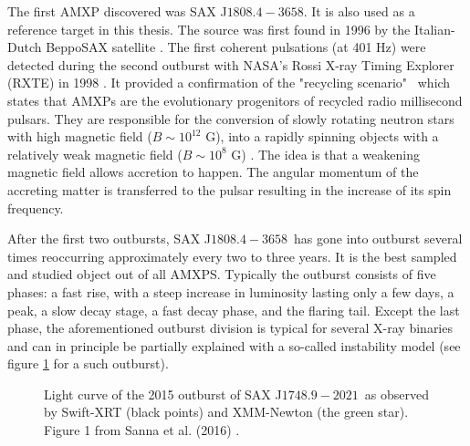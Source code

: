 \documentclass{wihuri}
\def\source{SAX J$1808.4-3658$}
\def\sourceb{SAX J$1748.9-2021$}
\begin{document}
The first AMXP discovered was \source. It is also used as a reference target in this thesis. %
The source was first found in 1996 by the Italian-Dutch BeppoSAX satellite \cite{zandsax1808}. %
The first coherent pulsations (at 401 Hz) were detected during the second outburst with NASA's Rossi X-ray Timing Explorer (RXTE) in 1998 \cite{wijnandssax1808}. %
It provided a confirmation of the "recycling scenario" \ which states that AMXPs are the evolutionary progenitors of recycled radio millisecond pulsars. They are responsible for the conversion of slowly rotating neutron stars with high magnetic field ($B \sim 10^{12}$ G), into a rapidly spinning objects with a relatively weak magnetic field ($B \sim 10^{8}$ G) \cite{patruno}. The idea is that a weakening magnetic field allows accretion to happen. The angular momentum of the accreting matter is transferred to the pulsar resulting in the increase of its spin frequency.%



After the first two outbursts, \source \ has gone into outburst several times reoccurring approximately every two to three years. It is the best sampled and studied object out of all AMXPS. Typically the outburst consists of five phases: a fast rise, with a steep increase in luminosity lasting only a few days, a peak, a slow decay stage, a fast decay phase, and the flaring tail. Except the last phase, the aforementioned outburst division is typical for several X-ray binaries and can in principle be partially explained with a so-called instability model \cite{disc-instability} (see figure \ref{fig:outburst} for a such outburst).




\begin{figure}
\centerline{} 
\caption{Light curve of the 2015 outburst of \sourceb \ as observed by Swift-XRT (black points) and XMM-Newton (the green star). Figure 1 from Sanna et al. (2016) \cite{outburst}.}%
\label{fig:outburst}
\end{figure}
\end{document}
